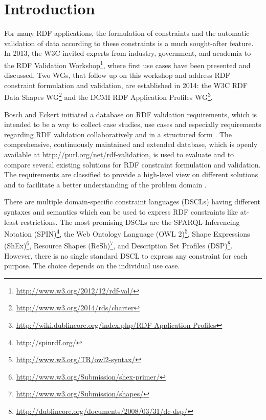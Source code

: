 \documentclass{llncs}
\begin{document}
\section{Introduction}

For many RDF applications, the formulation of constraints and the automatic validation of data according to these constraints is a much sought-after feature. 
In 2013, the W3C invited experts from industry, government, and academia to the RDF Validation Workshop\footnote{\url{http://www.w3.org/2012/12/rdf-val/}}, 
where first use cases have been presented and discussed. 
Two WGs, that follow up on this workshop and address RDF constraint formulation and validation, are established in 2014: 
the W3C RDF Data Shapes WG\footnote{\url{http://www.w3.org/2014/rds/charter}} and the DCMI RDF Application Profiles WG\footnote{\url{http://wiki.dublincore.org/index.php/RDF-Application-Profiles}}. 

Bosch and Eckert \cite{BoschEckert2014} initiated a database on RDF validation requirements, which is intended to be a way to collect case studies, use cases and especially requirements regarding RDF validation collaboratively and in a structured form \cite{DroegeBoschCharlesClayphanMatienzoRuehlePohlAlonenSvenssonCoyle2014}.
The comprehensive, continuously maintained and extended database, which is openly available at \url{http://purl.org/net/rdf-validation}, is used to evaluate and to compare several existing solutions for RDF constraint formulation and validation. 
The requirements are classified to provide a high-level view on different solutions and to facilitate a better understanding of the problem domain \cite{BoschEckert2014}.  

There are multiple domain-specific constraint languages (DSCLs) having different syntaxes and semantics which can be used to express RDF constraints like at-least restrictions.
The most promising DSCLs are 
the SPARQL Inferencing Notation (SPIN)\footnote{\url{http://spinrdf.org/}}, 
the Web Ontology Language (OWL 2)\footnote{\url{http://www.w3.org/TR/owl2-syntax/}}, 
Shape Expressions (ShEx)\footnote{\url{http://www.w3.org/Submission/shex-primer/}}, 
Resource Shapes (ReSh)\footnote{\url{http://www.w3.org/Submission/shapes/}}, 
and Description Set Profiles (DSP)\footnote{\url{http://dublincore.org/documents/2008/03/31/dc-dsp/}}.
However, there is no single standard DSCL to express any constraint for each purpose.
The choice depends on the individual use case.
\end{document}
